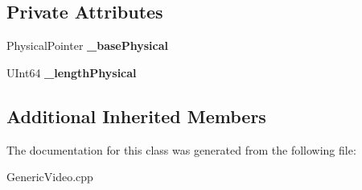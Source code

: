 \subsection*{Private Attributes}
\begin{DoxyCompactItemize}
\item 
\mbox{\label{class_generic_video___internal_1_1_video_buffer_memory_a2a3d1bd9471a97102455d70df009efe9}} 
Physical\+Pointer {\bfseries \+\_\+base\+Physical}
\item 
\mbox{\label{class_generic_video___internal_1_1_video_buffer_memory_ac7800cfa188f7abcea1ffd4024df576a}} 
U\+Int64 {\bfseries \+\_\+length\+Physical}
\end{DoxyCompactItemize}
\subsection*{Additional Inherited Members}


The documentation for this class was generated from the following file\+:\begin{DoxyCompactItemize}
\item 
Generic\+Video.\+cpp\end{DoxyCompactItemize}
